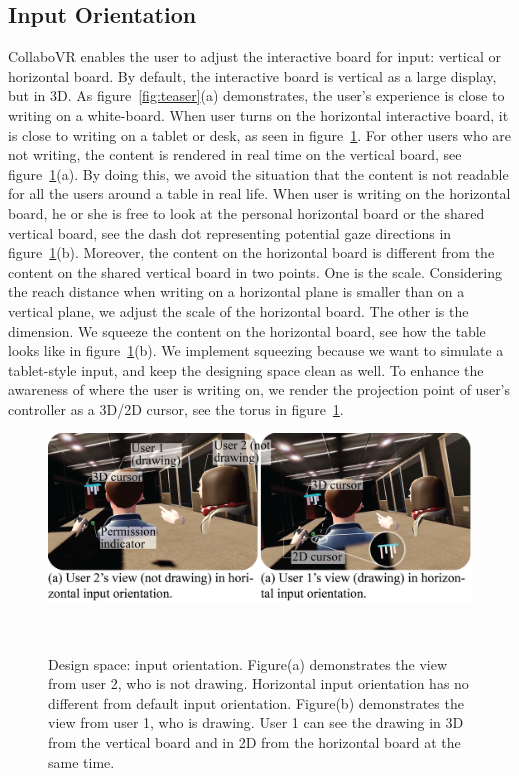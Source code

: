 \documentclass{sigchi}
\begin{document}
\subsection{Input Orientation}
CollaboVR enables the user to adjust the interactive board for input: vertical or horizontal board. By default, the interactive board is vertical as a large display, but in 3D. As figure~\ref{fig:teaser}(a) demonstrates, the user's experience is close to writing on a white-board. When user turns on the horizontal interactive board, it is close to writing on a tablet or desk, as seen in figure~\ref{fig:inputorientation}. For other users who are not writing, the content is rendered in real time on the vertical board, see figure~\ref{fig:inputorientation}(a). By doing this, we avoid the situation that the content is not readable for all the users around a table in real life. When user is writing on the horizontal board, he or she is free to look at the personal horizontal board or the shared vertical board, see the dash dot representing potential gaze directions in figure~\ref{fig:inputorientation}(b). Moreover, the content on the horizontal board is different from the content on the shared vertical board in two points. One is the scale. Considering the reach distance when writing on a horizontal plane is smaller than on a vertical plane, we adjust the scale of the horizontal board. The other is the dimension. We squeeze the content on the horizontal board, see how the table looks like in figure~\ref{fig:inputorientation}(b). We implement squeezing because we want to simulate a tablet-style input, and keep the designing space clean as well. To enhance the awareness of where the user is writing on, we render the projection point of user's controller as a 3D/2D cursor, see the torus in figure~\ref{fig:inputorientation}.

\begin{figure}[b!]
 \centering
 \includegraphics[width=0.95\columnwidth]{Figure4.png}
 \caption{Design space: input orientation. Figure(a) demonstrates the view from user 2, who is not drawing. Horizontal input orientation has no different from default input orientation. Figure(b) demonstrates the view from user 1, who is drawing. User 1 can see the drawing in 3D from the vertical board and in 2D from the horizontal board at the same time.
 }~\label{fig:inputorientation}
\end{figure}
\end{document}
